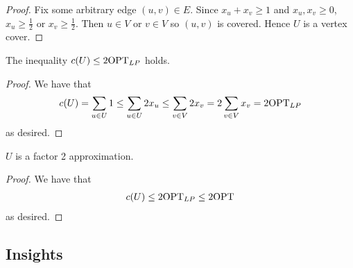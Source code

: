 \documentclass{article}
\begin{document}
\begin{proof}
    Fix some arbitrary edge $(u, v) \in E$. Since $x_u + x_v \geq 1$ and 
    $x_u, x_v \geq 0$, $x_u \geq \frac{1}{2}$ or $x_v \geq \frac{1}{2}$. Then $u \in V$
    or $v \in V$ so $(u, v)$ is covered. Hence $U$ is a vertex cover.
\end{proof}

\begin{theorem*}
    The inequality $c(U) \leq 2 \mathrm{OPT}_{LP}$ holds.
\end{theorem*}

\begin{proof}
    We have that
    \begin{align*}
        c(U) = \sum\limits_{u \in U} 1 \leq \sum\limits_{u \in U} 2 x_u \leq 
        \sum\limits_{v \in V} 2 x_v = 2 \sum\limits_{v \in V} x_v = 2 \mathrm{OPT}_{LP}
    \end{align*}
    as desired.
\end{proof}

\begin{theorem*}
    $U$ is a factor 2 approximation.
\end{theorem*}

\begin{proof}
    We have that
    \begin{align*}
        c(U) \leq 2 \mathrm{OPT}_{LP} \leq 2 \mathrm{OPT}
    \end{align*}
    as desired.
\end{proof}

\subsection*{Insights}
\end{document}
